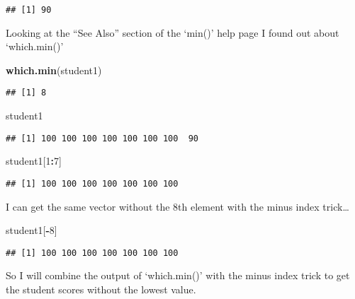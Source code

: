 \documentclass[
]{article}
\newenvironment{Shaded}{\begin{snugshade}}{\end{snugshade}}
\newcommand{\DecValTok}[1]{\textcolor[rgb]{0.00,0.00,0.81}{#1}}
\newcommand{\KeywordTok}[1]{\textcolor[rgb]{0.13,0.29,0.53}{\textbf{#1}}}
\newcommand{\NormalTok}[1]{#1}
\newcommand{\OperatorTok}[1]{\textcolor[rgb]{0.81,0.36,0.00}{\textbf{#1}}}
\begin{document}
\begin{verbatim}
## [1] 90
\end{verbatim}

Looking at the ``See Also'' section of the `min()' help page I found out
about `which.min()'

\begin{Shaded}
\begin{Highlighting}[]
\KeywordTok{which.min}\NormalTok{(student1)}
\end{Highlighting}
\end{Shaded}

\begin{verbatim}
## [1] 8
\end{verbatim}

\begin{Shaded}
\begin{Highlighting}[]
\NormalTok{student1}
\end{Highlighting}
\end{Shaded}

\begin{verbatim}
## [1] 100 100 100 100 100 100 100  90
\end{verbatim}

\begin{Shaded}
\begin{Highlighting}[]
\NormalTok{student1[}\DecValTok{1}\OperatorTok{:}\DecValTok{7}\NormalTok{]}
\end{Highlighting}
\end{Shaded}

\begin{verbatim}
## [1] 100 100 100 100 100 100 100
\end{verbatim}

I can get the same vector without the 8th element with the minus index
trick\ldots{}

\begin{Shaded}
\begin{Highlighting}[]
\NormalTok{student1[}\OperatorTok{-}\DecValTok{8}\NormalTok{]}
\end{Highlighting}
\end{Shaded}

\begin{verbatim}
## [1] 100 100 100 100 100 100 100
\end{verbatim}

So I will combine the output of `which.min()' with the minus index trick
to get the student scores without the lowest value.
\end{document}
